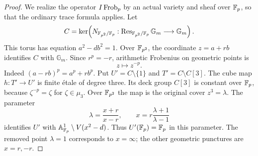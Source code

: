 \begin{proof}
We realize the operator $I\operatorname{Frob}_p$ by an actual variety and sheaf
over $\mathbb F_p$, so that the ordinary trace formula applies.
Let
\[
 C=\ker\!\left(N_{\mathbb F_{p^2}/\mathbb F_p}:
       \operatorname{Res}_{\mathbb F_{p^2}/\mathbb F_p}\mathbb G_m
       \longrightarrow\mathbb G_m\right).
\]
This torus has equation $a^2-db^2=1$. Over $\mathbb F_{p^2}$, the
coordinate $z=a+rb$ identifies $C$ with $\mathbb G_m$.
Since $r^p=-r$, arithmetic Frobenius on geometric points is
\begin{equation}\label{eq:torus-point-frobenius}
 z\longmapsto z^{-p}.
\end{equation}
Indeed $(a-rb)^p=a^p+rb^p$. Put $U'=C\setminus\{1\}$ and
$T'=C\setminus C[3]$. The cube map $h:T'\to U'$ is finite
\'{e}tale of degree three. Its deck group $C[3]$ is constant over
$\mathbb F_p$, because $\zeta^{-p}=\zeta$ for $\zeta\in\mu_3$.
Over $\mathbb F_{p^2}$ the map is the original cover $z^3=\lambda$.
The parameter
\begin{equation}\label{eq:torus-parameter}
 \lambda=\frac{x+r}{x-r},\qquad
 x=r\frac{\lambda+1}{\lambda-1}
\end{equation}
identifies $U'$ with $\mathbb A^1_{\mathbb F_p}\setminus V(x^2-d)$.
Thus $U'(\mathbb F_p)=\mathbb F_p$ in this parameter. The removed point
$\lambda=1$ corresponds to $x=\infty$; the other geometric
punctures are $x=r,-r$.


\end{proof}
